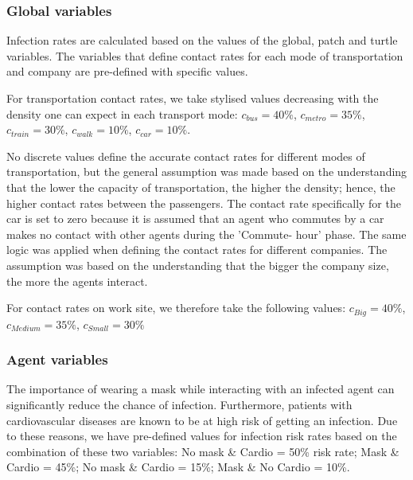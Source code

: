 \documentclass[smallextended]{svjour3}       %
\begin{document}
\subsubsection{Global variables}

Infection rates are calculated based on the values of the global, patch and turtle variables. The variables that define contact rates for each mode of transportation and company are pre-defined with specific values.

For transportation contact rates, we take stylised values decreasing with the density one can expect in each transport mode: $c_{bus} = 40\%$, $c_{metro} = 35\%$, $c_{train} = 30\%$, $c_{walk} = 10\%$, $c_{car} = 10\%$.

No discrete values define the accurate contact rates for different modes of transportation, but the general assumption was made based on the understanding that the lower the capacity of transportation, the higher the density; hence, the higher contact rates between the passengers. The contact rate specifically for the car is set to zero because it is assumed that an agent who commutes by a car makes no contact with other agents during the 'Commute- hour' phase. The same logic was applied when defining the contact rates for different companies. The assumption was based on the understanding that the bigger the company size, the more the agents interact.

For contact rates on work site, we therefore take the following values: $c_{Big} = 40\%$, $c_{Medium} = 35\%$, $c_{Small} = 30\%$


\subsubsection{Agent variables}


The importance of wearing a mask while interacting with an infected agent can significantly reduce the chance of infection. Furthermore, patients with cardiovascular diseases are known to be at high risk of getting an infection. Due to these reasons, we have pre-defined values for infection risk rates based on the combination of these two variables: No mask \& Cardio = 50\% risk rate; Mask \& Cardio = 45\%; No mask \& Cardio = 15\%; Mask \& No Cardio = 10\%.


\end{document}

